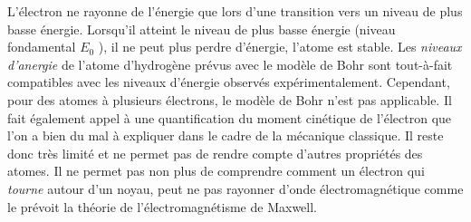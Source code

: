\documentclass[MPSI]{cours}
\begin{document}
L'électron ne rayonne de l'énergie que lors d'une transition vers un niveau de plus basse énergie. Lorsqu'il atteint le niveau de plus basse énergie (niveau fondamental $E_0$ ), il ne peut plus perdre d'énergie, l'atome est stable.
Les \textit{niveaux d'anergie} de l'atome d'hydrogène prévus avec le modèle de Bohr sont tout-à-fait compatibles avec les niveaux d'énergie observés expérimentalement. Cependant, pour des atomes à plusieurs électrons, le modèle de Bohr n'est pas applicable. Il fait également appel à une quantification du moment cinétique de l'électron que l'on a bien du mal à expliquer dans le cadre de la mécanique classique. Il reste donc très limité et ne permet pas de rendre compte d'autres propriétés des atomes. Il ne permet pas non plus de comprendre comment un électron qui \emph{tourne} autour d'un noyau, peut ne pas rayonner d'onde électromagnétique comme le prévoit la théorie de l'électromagnétisme de Maxwell.
\end{document}
